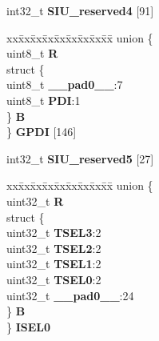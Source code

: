 \begin{DoxyCompactItemize}
\begin{tabbing}
\end{tabbing}\item 
\mbox{\label{structSIU__tag_abd5da4d8cedfb6154a52cf9a0db94afb}} 
int32\+\_\+t {\bfseries S\+I\+U\+\_\+reserved4} \mbox{[}91\mbox{]}
\item 
\mbox{\label{structSIU__tag_a49dee426c5ade66cac02bf195ad355e2}} 
\begin{tabbing}
xx\=xx\=xx\=xx\=xx\=xx\=xx\=xx\=xx\=\kill
union \{\\
\>uint8\_t {\bfseries R}\\
\>struct \{\\
\>\>uint8\_t {\bfseries \_\_pad0\_\_}:7\\
\>\>uint8\_t {\bfseries PDI}:1\\
\>\} {\bfseries B}\\
\} {\bfseries GPDI} \mbox{[}146\mbox{]}\\

\end{tabbing}\item 
\mbox{\label{structSIU__tag_a5d91ae9e2746b989a7714966a52faf24}} 
int32\+\_\+t {\bfseries S\+I\+U\+\_\+reserved5} \mbox{[}27\mbox{]}
\item 
\mbox{\label{structSIU__tag_a9401dbdfc0e4ce36e28df6eb757abf14}} 
\begin{tabbing}
xx\=xx\=xx\=xx\=xx\=xx\=xx\=xx\=xx\=\kill
union \{\\
\>uint32\_t {\bfseries R}\\
\>struct \{\\
\>\>uint32\_t {\bfseries TSEL3}:2\\
\>\>uint32\_t {\bfseries TSEL2}:2\\
\>\>uint32\_t {\bfseries TSEL1}:2\\
\>\>uint32\_t {\bfseries TSEL0}:2\\
\>\>uint32\_t {\bfseries \_\_pad0\_\_}:24\\
\>\} {\bfseries B}\\
\} {\bfseries ISEL0}\\


\end{tabbing}
\end{DoxyCompactItemize}
